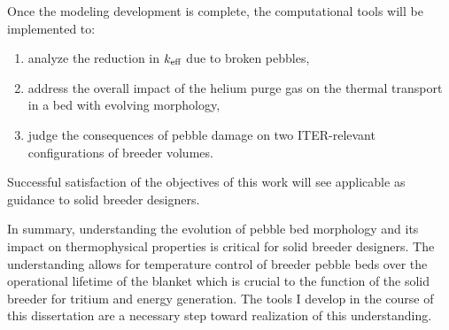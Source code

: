 Once the modeling development is complete, the computational tools will be implemented to:
\begin{enumerate}
	\item analyze the reduction in $k_\text{eff}$ due to broken pebbles,
	\item address the overall impact of the helium purge gas on the thermal transport in a bed with evolving morphology,
	\item judge the consequences of pebble damage on two ITER-relevant configurations of breeder volumes.
\end{enumerate}

Successful satisfaction of the objectives of this work will see applicable as guidance to solid breeder designers.




In summary, understanding the evolution of pebble bed morphology and its impact on thermophysical properties is critical for solid breeder designers. The understanding allows for temperature control of breeder pebble beds over the operational lifetime of the blanket which is crucial to the function of the solid breeder for tritium and energy generation. The tools I develop in the course of this dissertation are a necessary step toward realization of this understanding. 

